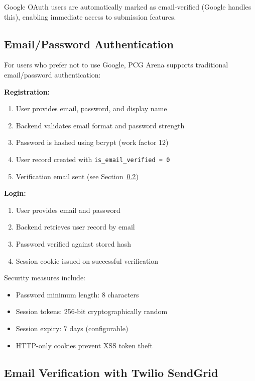 \documentclass[11pt,a4paper]{article}
\theoremstyle{plain}
\theoremstyle{definition}
\theoremstyle{remark}
\begin{document}
Google OAuth users are automatically marked as email-verified (Google handles this), enabling immediate access to submission features.

\subsection{Email/Password Authentication}
\label{subsec:email-auth}

For users who prefer not to use Google, PCG Arena supports traditional email/password authentication:

\textbf{Registration:}
\begin{enumerate}
    \item User provides email, password, and display name
    \item Backend validates email format and password strength
    \item Password is hashed using bcrypt (work factor 12)
    \item User record created with \texttt{is\_email\_verified = 0}
    \item Verification email sent (see Section~\ref{subsec:email-verification})
\end{enumerate}

\textbf{Login:}
\begin{enumerate}
    \item User provides email and password
    \item Backend retrieves user record by email
    \item Password verified against stored hash
    \item Session cookie issued on successful verification
\end{enumerate}

Security measures include:
\begin{itemize}
    \item Password minimum length: 8 characters
    \item Session tokens: 256-bit cryptographically random
    \item Session expiry: 7 days (configurable)
    \item HTTP-only cookies prevent XSS token theft
\end{itemize}

\subsection{Email Verification with Twilio SendGrid}
\label{subsec:email-verification}
\end{document}
